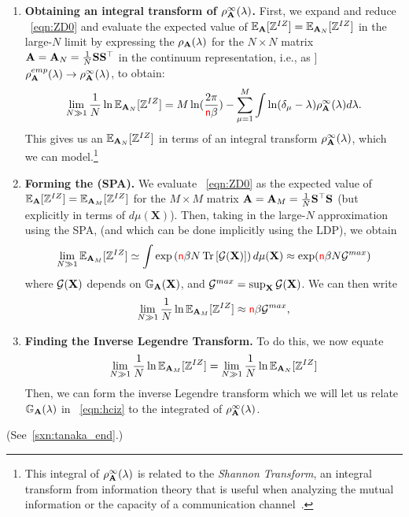 \begin{enumerate}
   \item
   \textbf{Obtaining an integral transform of $\rho^{\infty}_{\mathbf{A}}(\lambda)$.}
   First, we expand and reduce \EQN~\ref{eqn:ZD0} and evaluate the expected value of
   $\mathbb{E}_{\mathbf{A}}[\mathbb{Z}^{IZ}]=\mathbb{E}_{\mathbf{A}_{N}}[\mathbb{Z}^{IZ}]$ in the large-$N$ limit by expressing the $\rho_{\mathbf{A}}(\lambda)$
   for the $N\times N$ matrix $\mathbf{A}=\mathbf{A}_N=\tfrac{1}{N}{\mathbf{S}}{\mathbf{S}}^{\top}$
   in the continuum representation, i.e., as ]
   $\rho^{emp}_{\mathbf{A}}(\lambda)\rightarrow \rho^{\infty}_{\mathbf{A}}(\lambda)$, to obtain:
   \begin{equation}
      \label{eqn:ZD_step1}
      \lim_{N\gg 1}\dfrac{1}{N}
      \ln\mathbb{E}_{\mathbf{A}_{N}}[\mathbb{Z}^{IZ}] =M\ln(\dfrac{2\pi}{{\color{red}\sf{n}}\beta})-\sum_{\mu=1}^{M}\int \ln(\delta_{\mu}-\lambda)\rho^{\infty}_{\mathbf{A}}(\lambda)d\lambda  .
   \end{equation}
   This gives us an $\mathbb{E}_{\mathbf{A}_{N}}[\mathbb{Z}^{IZ}]$ in terms of an integral transform $\rho^{\infty}_{\mathbf{A}}(\lambda)$, which we can model.\footnote{This integral of $\rho^{\infty}_{\mathbf{A}}(\lambda)$  is related to the \emph{Shannon Transform}, an integral transform from information theory that is useful when analyzing the mutual information or the capacity of a communication channel~\cite{Tanaka2007}. }
   \item
   \textbf{Forming the \SaddlePointApproximation (SPA).}
   We evaluate \EQN~\ref{eqn:ZD0} as the expected value of $\mathbb{E}_{\mathbf{A}}[\mathbb{Z}^{IZ}]=\mathbb{E}_{\mathbf{A}_{M}}[\mathbb{Z}^{IZ}]$
   for the $M \times M$ matrix $\mathbf{A}=\mathbf{A}_M=\tfrac{1}{N}{\mathbf{S}}^{\top}{\mathbf{S}}$
   (but explicitly in terms of $d\mu(\mathbf{X})$).
   Then, taking in the large-$N$ approximation using the SPA,
    (and which can be done implicitly using the LDP), we obtain
   \begin{equation}  
  \label{eqn:ZD1} 
  \lim_{N \gg 1} \mathbb{E}_{\mathbf{A}_{M}}[\mathbb{Z}^{IZ}]\simeq\int  \exp\left({\color{red}\sf{n}}\beta N\mbox{}\operatorname{Tr}\left[\mathcal{G}(\mathbf{X})\right]\right)d\mu(\mathbf{X}) \approx \exp({\color{red}\sf{n}}\beta N\mathcal{G}^{max})
\end{equation}
  where  $\mathcal{G}(\mathbf{X})$ depends on $\mathbb{G}_{\mathbf{A}}(\mathbf{X})$, and $\mathcal{G}^{max}=\sup_{\mathbf{X}}\mathcal{G}(\mathbf{X})$.
  We can then write
   \begin{equation}
      \label{eqn:ZD_step2}
      \lim_{N \gg 1}\dfrac{1}{N}\ln\mathbb{E}_{\mathbf{A}_{M}}[\mathbb{Z}^{IZ}] \approx {\color{red}\sf{n}}\beta\mathcal{G}^{max}  ,
   \end{equation}

 \item
 \textbf{Finding the Inverse Legendre Transform.}
  To do this, we now equate
  \begin{equation}
  \lim_{N \gg 1}\frac{1}{N}\ln\mathbb{E}_{\mathbf{A}_{M}}[\mathbb{Z}^{IZ}]=  \lim_{N \gg 1}\frac{1}{N}\ln\mathbb{E}_{\mathbf{A}_{N}}[\mathbb{Z}^{IZ}]
  \end{equation}
 Then, we can form the
 inverse Legendre transform  which we will let us relate $\mathbb{G}_{\mathbf{A}}(\lambda)$ in \EQN~\ref{eqn:hciz} to the integrated \RTransform of $\rho^{\infty}_{\mathbf{A}}(\lambda)$.
\end{enumerate}

\noindent

(See~\ref{sxn:tanaka_end}.)


